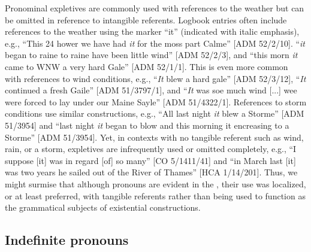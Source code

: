 Pronominal expletives are commonly used with references to the weather but can be omitted in reference to intangible referents.  Logbook entries often include references to the weather using the  marker “it” (indicated with italic emphasis), e.g., “This 24 hower we have had \textit{it} for the moss part Calme” [ADM 52/2/10]. “\textit{it} began to raine to raine have been little wind” [ADM 52/2/3], and “this morn \textit{it} came to WNW a very hard Gale” [ADM 52/1/1]. This is even more common with references to wind conditions, e.g., “\textit{It} blew a hard gale” [ADM 52/3/12], “\textit{It} continued a fresh Gaile” [ADM 51/3797/1], and “\textit{It} was soe much wind [...] wee were forced to lay under our Maine Sayle” [ADM 51/4322/1]. References to storm conditions use similar constructions, e.g., “All last night \textit{it} blew a Storme” [ADM 51/3954] and “last night \textit{it} began to blow and this morning it encreasing to a Storme” [ADM 51/3954]. Yet, in contexts with no tangible referent such as wind, rain, or a storm, expletives are infrequently used or omitted completely, e.g., “I suppose [it] was in regard [of] so many” [CO 5/1411/41] and “in March last [it] was two years he sailed out of the River of Thames” [HCA 1/14/201]. Thus, we might surmise that although  pronouns are evident in the , their use was localized, or at least preferred, with tangible referents rather than being used to function as the grammatical subjects of existential constructions.

\subsection{{Indefinite pronouns}}\label{sec:5.4.4}

